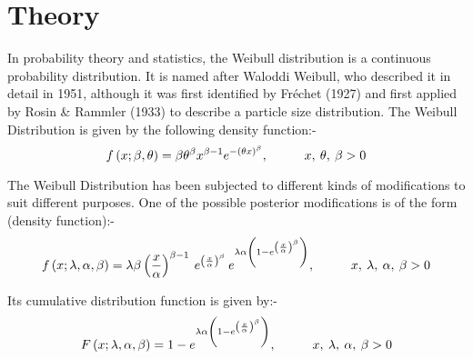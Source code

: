 \documentclass[11pt]{article}
\numberwithin{equation}{section}
\begin{document}


\pagebreak

\renewcommand\contentsname{{\Huge Contents}\vspace{0.5cm}}
\cleardoublepage
{}
{}
\tableofcontents

\cleardoublepage
{}
{}
\renewcommand\listfigurename{{\Huge List of Figures}\vspace{0.5cm}}
\listoffigures

\pagebreak

\section{Theory}
\medskip

In probability theory and statistics, the Weibull distribution is a continuous probability distribution. It is named after Waloddi Weibull, who described it in detail in 1951, although it was first identified by Fr\'{e}chet (1927) and first applied by Rosin \& Rammler (1933) to describe a particle size distribution. The Weibull Distribution is given by the following density function:- 
\begin{equation}	\label{eq:weibull_pdf}
f\left(x; \beta, \theta\right) = \beta \theta^\beta x^{\beta - 1} e^{-\left(\theta x\right)^\beta}, \hspace{1.0cm} x,\: \theta,\: \beta > 0
\end{equation}

The Weibull Distribution has been subjected to different kinds of modifications to suit different purposes. One of the possible posterior modifications is of the form (density function):- 
\begin{equation}	\label{eq:mod_weibull_pdf}
f\left(x; \lambda, \alpha, \beta\right) = \lambda \beta \left(\dfrac{x}{\alpha}\right)^{\beta - 1}\: e^{\left(\frac{x}{\alpha}\right)^{\beta}}\: e^{\lambda \alpha \left(1 - e^{\left(\frac{x}{\alpha}\right)^{\beta}}\right)}, \hspace{1.0cm} x,\: \lambda,\: \alpha,\: \beta > 0
\end{equation}

Its cumulative distribution function is given by:-
\begin{equation}	\label{eq:mod_weibull_cdf}
F\left(x; \lambda, \alpha, \beta\right) = 1 - e^{\lambda \alpha \left(1 - e^{\left(\frac{x}{\alpha}\right)^{\beta}}\right)},\hspace{1.0cm} x,\: \lambda,\: \alpha,\: \beta > 0
\end{equation}
\end{document}
